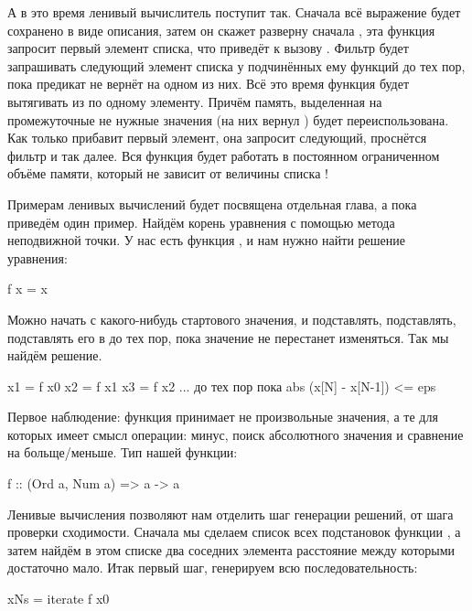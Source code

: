 А в это время ленивый вычислитель поступит так.
Сначала всё выражение будет сохранено в виде описания, затем
он скажет разверну сначала , эта функция
запросит первый элемент списка, что приведёт к вызову 
. Фильтр будет запрашивать следующий элемент
списка у подчинённых ему функций до тех пор, пока 
предикат  не вернёт  на одном из них. 
Всё это время функция  будет вытягивать из 
 по одному элементу. Причём память, выделенная
на промежуточные не нужные значения (на них  вернул )
будет переиспользована. Как только  прибавит первый
элемент, она запросит следующий, проснётся фильтр и так далее.
Вся функция будет работать в постоянном ограниченном объёме памяти, который 
не зависит от величины списка !

Примерам ленивых вычислений будет посвящена отдельная
глава, а пока приведём один пример. Найдём корень уравнения 
с помощью метода неподвижной точки.
У нас есть функция , и нам нужно найти 
решение уравнения:

\begin{code}
f x = x
\end{code}

Можно начать с какого-нибудь стартового значения, и подставлять,
подставлять, подставлять его в  до тех пор, пока значение
не перестанет изменяться. Так мы найдём решение. 

\begin{code}
x1 = f x0
x2 = f x1
x3 = f x2
...
до тех пор пока abs (x[N] - x[N-1]) <= eps
\end{code}

Первое наблюдение: функция принимает не произвольные значения,
а те для которых имеет смысл операции: минус, поиск абсолютного
значения и сравнение на больще/меньше. Тип нашей функции:

\begin{code}
f :: (Ord a, Num a) => a -> a
\end{code}

Ленивые вычисления позволяют нам отделить шаг генерации
решений, от шага проверки сходимости. Сначала мы сделаем
список всех подстановок функции , а затем найдём
в этом списке два соседних элемента расстояние между которыми 
достаточно мало. Итак первый шаг, генерируем всю
последовательность:

\begin{code}
xNs = iterate f x0
\end{code}

